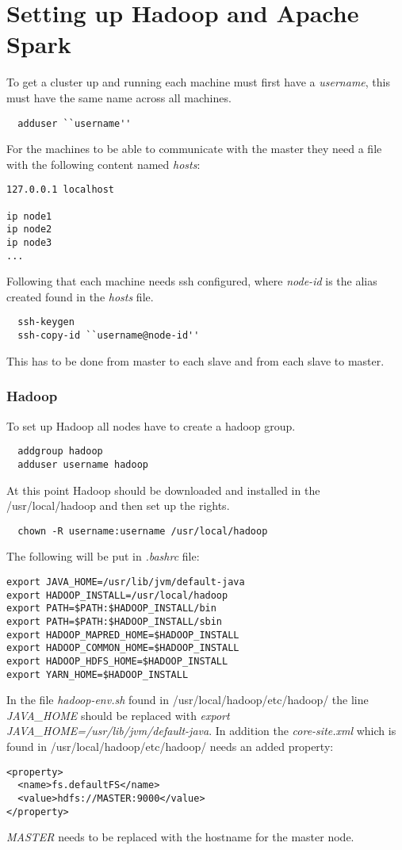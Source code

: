 \section{Setting up Hadoop and Apache Spark}
\label{sec:hadoop}

To get a cluster up and running each machine must first have a \emph{username}, this must have the same name across all machines.
\lstset{language=bash}
\begin{lstlisting}
  adduser ``username''
\end{lstlisting}
For the machines to be able to communicate with the master they need a file with the following content named \emph{hosts}:
\begin{verbatim}
127.0.0.1 localhost

ip node1
ip node2
ip node3
...
\end{verbatim}
Following that each machine needs ssh configured, where \emph{node-id} is the alias created found in the \emph{hosts} file.
\begin{lstlisting}
  ssh-keygen
  ssh-copy-id ``username@node-id''
\end{lstlisting}
This has to be done from master to each slave and from each slave to master.

\subsubsection*{Hadoop}
To set up Hadoop all nodes have to create a hadoop group.
\begin{lstlisting}
  addgroup hadoop
  adduser username hadoop
\end{lstlisting}
At this point Hadoop should be downloaded and installed in the \textsf{/usr/local/hadoop} and then set up the rights.
\begin{lstlisting}
  chown -R username:username /usr/local/hadoop
\end{lstlisting}
The following will be put in \emph{.bashrc} file:
\begin{verbatim}
export JAVA_HOME=/usr/lib/jvm/default-java
export HADOOP_INSTALL=/usr/local/hadoop
export PATH=$PATH:$HADOOP_INSTALL/bin
export PATH=$PATH:$HADOOP_INSTALL/sbin
export HADOOP_MAPRED_HOME=$HADOOP_INSTALL
export HADOOP_COMMON_HOME=$HADOOP_INSTALL
export HADOOP_HDFS_HOME=$HADOOP_INSTALL
export YARN_HOME=$HADOOP_INSTALL
\end{verbatim}
In the file \emph{hadoop-env.sh} found in \textsf{/usr/local/hadoop/etc/hadoop/} the line \emph{JAVA\_HOME} should be replaced with \emph{export JAVA\_HOME=/usr/lib/jvm/default-java}.
In addition the \emph{core-site.xml} which is found in \textsf{/usr/local/hadoop/etc/hadoop/} needs an added property: 
\begin{verbatim}
<property>
  <name>fs.defaultFS</name>
  <value>hdfs://MASTER:9000</value>
</property>
\end{verbatim}
\emph{MASTER} needs to be replaced with the hostname for the master node.

